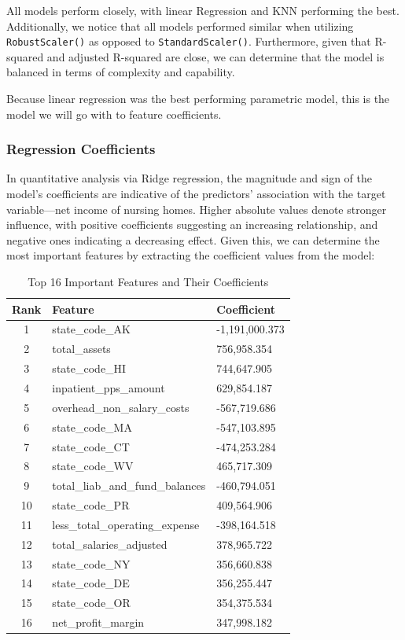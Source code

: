 \documentclass{article}
\theoremstyle{mytheoremstyle}
\theoremstyle{mytheoremstyle}
\theoremstyle{myproblemstyle}
\begin{document}
\FloatBarrier %

All models perform closely, with linear Regression and KNN performing the best. Additionally, we notice that all models performed similar when utilizing \texttt{RobustScaler()} as opposed to \texttt{StandardScaler()}. Furthermore, given that R-squared and adjusted R-squared are close, we can determine that the model is balanced in terms of complexity and capability. 

Because linear regression was the best performing parametric model, this is the model we will go with to feature coefficients. 
\pagebreak

\subsubsection{Regression Coefficients}

In quantitative analysis via Ridge regression, the magnitude and sign of the model's coefficients are indicative of the predictors' association with the target variable—net income of nursing homes. Higher absolute values denote stronger influence, with positive coefficients suggesting an increasing relationship, and negative ones indicating a decreasing effect. Given this, we can determine the most important features by extracting the coefficient values from the model:


\begin{table}[ht]
\centering
\caption{Top 16 Important Features and Their Coefficients}
\begin{tabular}{@{}cll@{}}
\toprule
Rank & Feature & Coefficient \\
\midrule
1 & state\_code\_AK & -1,191,000.373 \\
2 & total\_assets & 756,958.354 \\
3 & state\_code\_HI & 744,647.905 \\
4 & inpatient\_pps\_amount & 629,854.187 \\
5 & overhead\_non\_salary\_costs & -567,719.686 \\
6 & state\_code\_MA & -547,103.895 \\
7 & state\_code\_CT & -474,253.284 \\
8 & state\_code\_WV & 465,717.309 \\
9 & total\_liab\_and\_fund\_balances & -460,794.051 \\
10 & state\_code\_PR & 409,564.906 \\
11 & less\_total\_operating\_expense & -398,164.518 \\
12 & total\_salaries\_adjusted & 378,965.722 \\
13 & state\_code\_NY & 356,660.838 \\
14 & state\_code\_DE & 356,255.447 \\
15 & state\_code\_OR & 354,375.534 \\
16 & net\_profit\_margin & 347,998.182 \\
\bottomrule
\end{tabular}
\label{tab:important_features}
\end{table}
\end{document}
